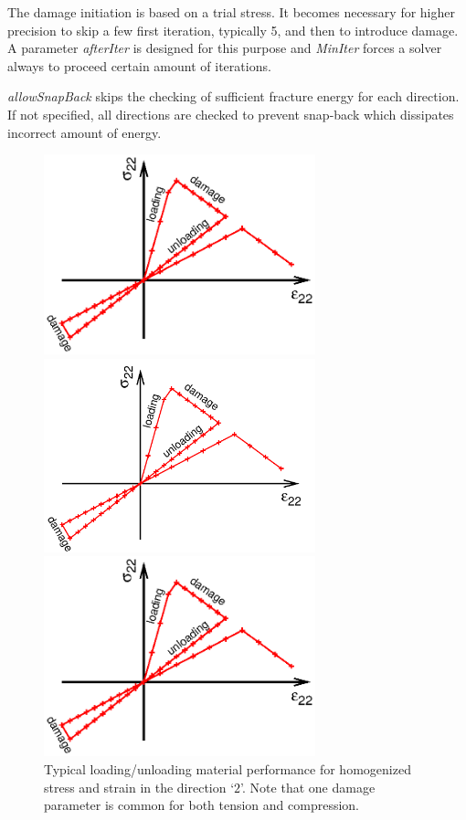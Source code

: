 \documentclass[a4paper]{article}
\newcommand{\param}[1]{{\it #1}}
\begin{document}
The damage initiation is based on a trial stress. It becomes necessary for  higher precision to skip a few first iteration, typically 5, and then to introduce damage. A parameter \param{afterIter} is designed for this purpose and \param{MinIter} forces a solver always to proceed certain amount of iterations.

\param{allowSnapBack} skips the checking of sufficient fracture energy for each direction. If not specified, all directions are checked to prevent snap-back which dissipates incorrect amount of energy.


\begin{figure}[!htb]
\begin{htmlonly}
  \centerline{\includegraphics[width=0.7\textwidth]{Compodamagemat_test.eps}}
\end{htmlonly}
\ifpdf
\centerline{\includegraphics[width=0.7\textwidth]{Compodamagemat_test.pdf}}
\else
\centerline{\includegraphics[width=0.7\textwidth]{Compodamagemat_test.eps}}
\fi
  \caption{Typical loading/unloading material performance for homogenized stress and strain in the direction `${2}$'. Note that one damage parameter is common for both tension and compression.}
  \label{comp_performance}
\end{figure}
\end{document}
